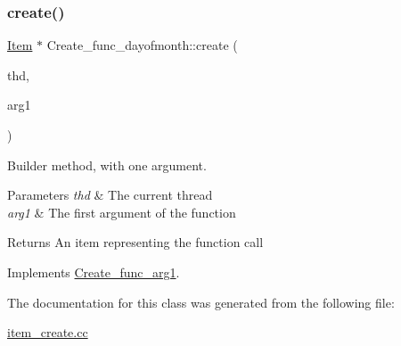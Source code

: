\subsubsection{\texorpdfstring{create()}{create()}}
{\footnotesize\ttfamily \mbox{\hyperlink{classItem}{Item}} $\ast$ Create\+\_\+func\+\_\+dayofmonth\+::create (\begin{DoxyParamCaption}\item[{T\+HD $\ast$}]{thd,  }\item[{\mbox{\hyperlink{classItem}{Item}} $\ast$}]{arg1 }\end{DoxyParamCaption})\hspace{0.3cm}{\ttfamily [virtual]}}

Builder method, with one argument. 
\begin{DoxyParams}{Parameters}
{\em thd} & The current thread \\
\hline
{\em arg1} & The first argument of the function \\
\hline
\end{DoxyParams}
\begin{DoxyReturn}{Returns}
An item representing the function call 
\end{DoxyReturn}


Implements \mbox{\hyperlink{classCreate__func__arg1_a3e9a98f755cd82c3e762e334c955a8c9}{Create\+\_\+func\+\_\+arg1}}.



The documentation for this class was generated from the following file\+:\begin{DoxyCompactItemize}
\item 
\mbox{\hyperlink{item__create_8cc}{item\+\_\+create.\+cc}}\end{DoxyCompactItemize}
